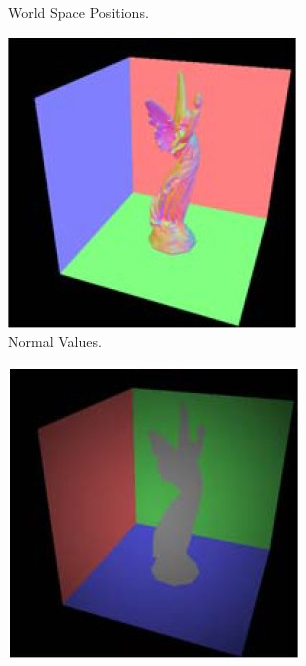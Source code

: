\begin{figure}
\begin{subfigure}[b]{0.4\textwidth}
                \caption{World Space Positions.}
                \label{fig:RSM1}
        \end{subfigure}
        \begin{subfigure}[b]{0.4\textwidth}
        		\centering
                \includegraphics[width=\textwidth]{RSM2.jpg}
                \caption{Normal Values.}
                \label{fig:RSM2}
        \end{subfigure}
        \begin{subfigure}[b]{0.4\textwidth}
        		\centering
                \includegraphics[width=\textwidth]{RSM3.jpg}

\end{subfigure}
\end{figure}
